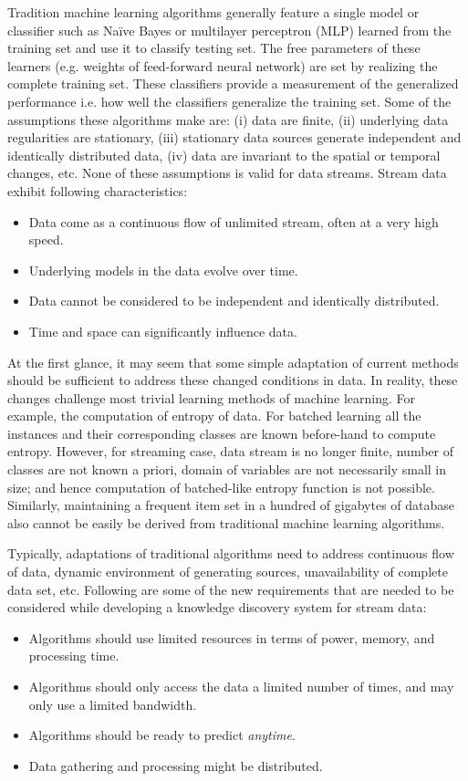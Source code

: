 Tradition machine learning algorithms generally feature a single model or classifier such as Na\"ive Bayes or multilayer perceptron (MLP) learned from the training set and use it to classify testing set. The free parameters of these learners (e.g. weights of feed-forward neural network) are set by realizing the complete training set. These classifiers provide a measurement of the generalized performance i.e. how well the classifiers generalize the training set. Some of the assumptions these algorithms make are: (i) data are finite, (ii) underlying data regularities are stationary, (iii) stationary data sources generate independent and identically distributed data, (iv) data are invariant to the spatial or temporal changes, etc. None of these assumptions is valid for data streams. Stream data exhibit following characteristics: 
\begin{itemize}
    \item Data come as a continuous flow of unlimited stream, often at a very high speed.
    \item Underlying models in the data evolve over time.
    \item Data cannot be considered to be independent and identically distributed.
    \item Time and space can significantly influence data.
\end{itemize}
At the first glance, it may seem that some simple adaptation of current methods should be sufficient to address these changed conditions in data. In reality, these changes challenge most trivial learning methods of machine learning. For example, the computation of entropy of data. For batched learning all the instances and their corresponding classes are known before-hand to compute entropy. However, for streaming case, data stream is no longer finite, number of classes are not known a priori, domain of variables are not necessarily small in size; and hence computation of batched-like entropy function is not possible. Similarly, maintaining a frequent item set in a hundred of gigabytes of database also cannot be easily be derived from traditional machine learning algorithms.

Typically, adaptations of traditional algorithms need to address continuous flow of data, dynamic environment of generating sources, unavailability of complete data set, etc. Following are some of the new requirements that are needed to be considered while developing a knowledge discovery system for stream data:
\begin{itemize}
    \item Algorithms should use limited resources in terms of power, memory, and processing time.
    \item Algorithms should only access the data a limited number of times, and may only use a limited bandwidth.
    \item Algorithms should be ready to predict {\it anytime}. 
    \item Data gathering and processing might be distributed.
\end{itemize}

